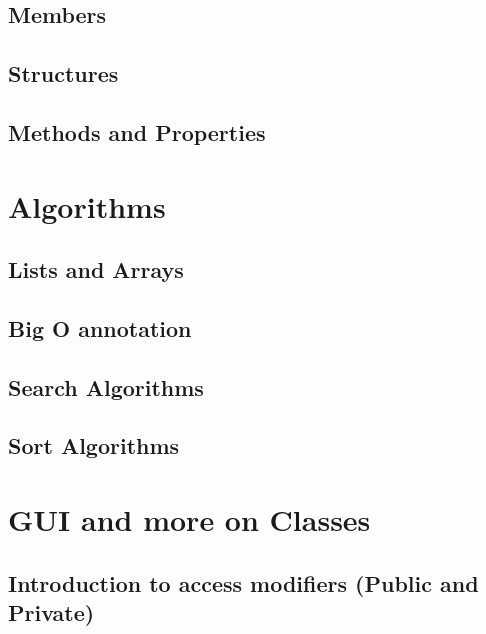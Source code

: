 \documentclass[
]{book}
\begin{document}
\hypertarget{members}{%
\section{Members}\label{members}}

\hypertarget{structures}{%
\section{Structures}\label{structures}}

\hypertarget{methods-and-properties}{%
\section{Methods and Properties}\label{methods-and-properties}}

\hypertarget{algorithms}{%
\chapter{Algorithms}\label{algorithms}}

\hypertarget{lists-and-arrays}{%
\section{Lists and Arrays}\label{lists-and-arrays}}

\hypertarget{big-o-annotation}{%
\section{Big O annotation}\label{big-o-annotation}}

\hypertarget{search-algorithms}{%
\section{Search Algorithms}\label{search-algorithms}}

\hypertarget{sort-algorithms}{%
\section{Sort Algorithms}\label{sort-algorithms}}

\hypertarget{gui-and-more-on-classes}{%
\chapter{GUI and more on Classes}\label{gui-and-more-on-classes}}

\hypertarget{introduction-to-access-modifiers-public-and-private}{%
\section{Introduction to access modifiers (Public and Private)}\label{introduction-to-access-modifiers-public-and-private}}
\end{document}
